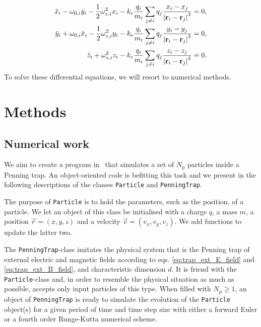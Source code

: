 \begin{subequations}\label{eq:p4_diffeq_many_particles_xyz}
    \begin{align}
        \ddot{x}_i - \omega_{0,i} \dot{y}_i - \frac{1}{2}\omega_{z,i}^2 x_i - k_e \frac{q_i}{m_i} \sum_{j\neq i} q_j \frac{x_i - x_j}{\abs{\mathbf{r}_i - \mathbf{r}_j}^3} =0, \label{eq:p4_diffeq_many_particles_x} \\
        \ddot{y}_i + \omega_{0,i} \dot{x}_i - \frac{1}{2}\omega_{z,i}^2 y_i - k_e \frac{q_i}{m_i} \sum_{j\neq i} q_j \frac{y_i - y_j}{\abs{\mathbf{r}_i - \mathbf{r}_j}^3} =0, \label{eq:p4_diffeq_many_particles_y} \\ 
        \ddot{z}_i + \omega_{z,i}^2 z_i - k_e \frac{q_i}{m_i} \sum_{j\neq i} q_j \frac{z_i - z_j}{\abs{\mathbf{r}_i - \mathbf{r}_j}^3} =0. \label{eq:p4_diffeq_many_particles_z}
    \end{align}
\end{subequations}
To solve these differential equations, we will resort to numerical methods. 



\section{Methods}\label{sec:methods}


\subsection{ Numerical work}\label{sec:code}

We aim to create a program in \CC\, that simulates a set of $N_\mathrm{p}$ particles inside a Penning trap. An object-oriented code is befitting this task and we present in the following descriptions of the classes \verb|Particle| and \verb|PenningTrap|.

The purpose of \texttt{Particle} is to hold the parameters, such as the position, of a particle. We let an object of this class be initialised with a charge $q$, a mass $m$, a position $\vec{r} = (x,y,z)$ and a velocity $\vec{v} = (v_x, v_y, v_z)$. We add functions to update the latter two. 

The \texttt{PenningTrap}-class imitates the physical system that is the Penning trap of external electric and magnetic fields according to eqs. \eqref{eq:trap_ext_E_field} and \eqref{eq:trap_ext_B_field}, and characteristic dimension $d$. It is friend with the \texttt{Particle}-class and, in order to resemble the physical situation as much as possible, accepts only input particles of this type. When filled with $N_\mathrm{p}\geq 1$, an object of \texttt{PenningTrap} is ready to simulate the evolution of the \texttt{Particle} object(s) for a given period of time and time step size with either a forward Euler or a fourth order Runge-Kutta numerical scheme. 

